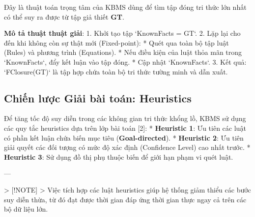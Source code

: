 Đây là thuật toán trọng tâm của KBMS dùng để tìm tập đóng tri thức lớn nhất có thể suy ra được từ tập giả thiết \textbf{GT}.

\textbf{Mô tả thuật thuật giải}:
1.  Khởi tạo tập `KnownFacts = GT`.
2.  Lặp lại cho đến khi không còn sự thật mới (Fixed-point):
    *   Quét qua toàn bộ tập luật (Rules) và phương trình (Equations).
    *   Nếu điều kiện của luật thỏa mãn trong `KnownFacts`, đẩy kết luận vào tập đóng.
    *   Cập nhật `KnownFacts`.
3.  Kết quả: `FClosure(GT)` là tập hợp chứa toàn bộ tri thức tường minh và dẫn xuất.

\subsection{Chiến lược Giải bài toán: Heuristics}

Để tăng tốc độ suy diễn trong các không gian tri thức khổng lồ, KBMS sử dụng các quy tắc heuristics dựa trên lớp bài toán [2]:
*   \textbf{Heuristic 1}: Ưu tiên các luật có phần kết luận chứa biến mục tiêu (\textbf{Goal-directed}).
*   \textbf{Heuristic 2}: Ưu tiên giải quyết các đối tượng có mức độ xác định (Confidence Level) cao nhất trước.
*   \textbf{Heuristic 3}: Sử dụng đồ thị phụ thuộc biến để giới hạn phạm vi quét luật.

---

> [!NOTE]
> Việc tích hợp các luật heuristics giúp hệ thống giảm thiểu các bước suy diễn thừa, từ đó đạt được thời gian đáp ứng thời gian thực ngay cả trên các bộ dữ liệu lớn.

